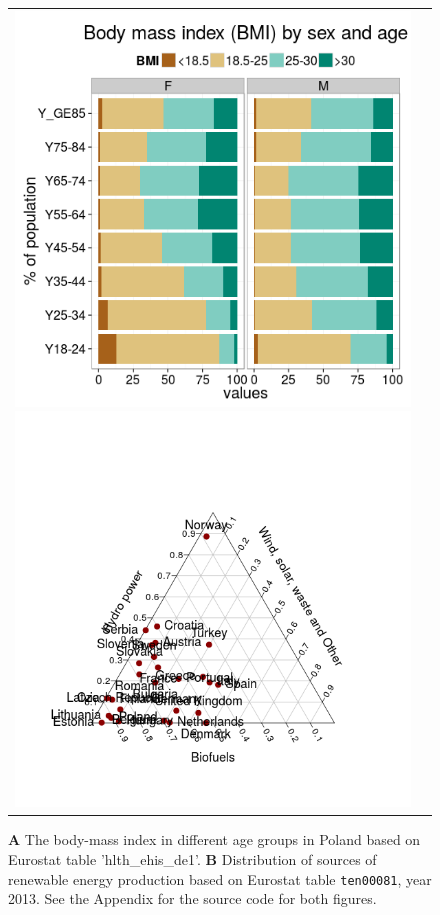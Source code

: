 \begin{figure}
\begin{center}
\begin{tabular}{cc}
\includegraphics{2015-manu-bmi-1}
\includegraphics{2015-manu-energy-1}
\end{tabular}
\end{center}
\caption{{\bf A} The body-mass index in different age groups in Poland based on Eurostat table 'hlth\_ehis\_de1'. {\bf B} Distribution of sources of renewable energy production based on Eurostat table \texttt{ten00081}, year 2013. See the Appendix for the source code for both figures.}
\label{fig:bmi}
\end{figure}



